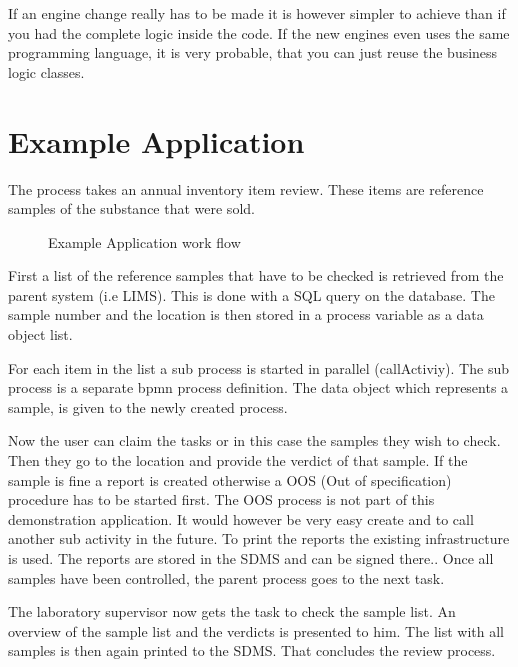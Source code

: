 \documentclass[paper=a4,twoside=false,BCOR=0mm,DIV=calc,fontsize=12pt]{scrartcl}
\begin{document}
If an engine change really has to be made it is however simpler to achieve than if you had the complete logic inside the code. If the new engines even
uses the same programming language, it is very probable, that you can just reuse the business logic classes. 



\section{Example Application}
The process takes an annual inventory item review. These items are reference samples of the substance that were sold.

\begin{figure}
    \begin{center}
    \end{center}
  \caption{Example Application work flow}
  \label{panexampleWorkflow}
\end{figure} 

First a list of the reference samples that have to be checked is retrieved from the parent system (i.e LIMS). This is done with a SQL query on the database. 
The sample number and the location is then stored in a process variable as a data object list.

For each item in the list a sub process is started in parallel (callActiviy). The sub process is a separate bpmn process definition.
The data object which represents a sample, is given to the newly created process.

Now the user can claim the tasks or in this case the samples they wish to check. Then they go to the location and provide the verdict of that sample. If the sample is fine a report is created otherwise a OOS (Out of specification) procedure has to be started first. The OOS process is not part of this demonstration application. It would however be very easy create and to call another sub activity in the future.
To print the reports the existing infrastructure is used. The reports are stored in the SDMS and can be signed there..
Once all samples have been controlled, the parent process goes to the next task.

The laboratory supervisor now gets the task to check the sample list. An overview of the sample list and the verdicts is presented to him.
The list with all samples is then again printed to the SDMS. That concludes the review process.
\end{document}
